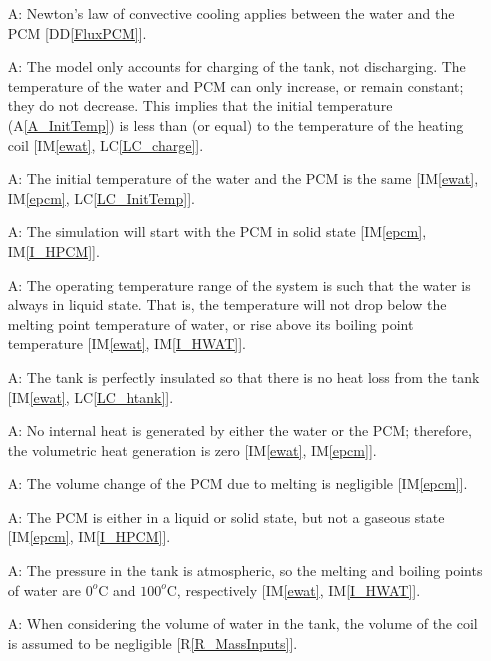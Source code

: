 \documentclass[12pt]{article}
\newcommand{\ddref}[1]{DD\ref{#1}}
\newcounter{assumpnum} %
\newcommand{\aref}[1]{A\ref{#1}}
\newcommand{\iref}[1]{IM\ref{#1}}
\newcommand{\rref}[1]{R\ref{#1}}
\newcommand{\lcref}[1]{LC\ref{#1}}
\begin{document}
\begin{itemize}
\item[A\refstepcounter{assumpnum}\theassumpnum \label{A_Newt_pcm}:] Newton's law
  of convective cooling applies between the water and the PCM [\ddref{FluxPCM}].

\item[A\refstepcounter{assumpnum}\theassumpnum \label{A_charge}:] The model only
  accounts for charging of the tank, not discharging.  The temperature of the
  water and PCM can only increase, or remain constant; they do not decrease.
  This implies that the initial temperature (\aref{A_InitTemp}) is less than (or
  equal) to the temperature of the heating coil [\iref{ewat},
  \lcref{LC_charge}].

\item[A\refstepcounter{assumpnum}\theassumpnum \label{A_InitTemp}:] The
  initial temperature of the water and the PCM is the same [\iref{ewat},
  \iref{epcm}, \lcref{LC_InitTemp}].

\item[A\refstepcounter{assumpnum}\theassumpnum \label{A_OpRangePCM}:] The
  simulation will start with the PCM in solid state [\iref{epcm},
  \iref{I_HPCM}].

\item[A\refstepcounter{assumpnum}\theassumpnum \label{A_OpRange}:] The operating
  temperature range of the system is such that the water is always in liquid
  state. That is, the temperature will not drop below the melting point
  temperature of water, or rise above its boiling point temperature
  [\iref{ewat}, \iref{I_HWAT}].
 
\item[A\refstepcounter{assumpnum}\theassumpnum \label{A_htank}:] The tank is
  perfectly insulated so that there is no heat loss from the tank [\iref{ewat},
  \lcref{LC_htank}].

\item[A\refstepcounter{assumpnum}\theassumpnum \label{A_int_heat}:] No internal
  heat is generated by either the water or the PCM; therefore, the volumetric
  heat generation is zero [\iref{ewat}, \iref{epcm}].
	
\item[A\refstepcounter{assumpnum}\theassumpnum \label{A_vpcm}:] The volume
  change of the PCM due to melting is negligible [\iref{epcm}].

\item[A\refstepcounter{assumpnum}\theassumpnum \label{A_PCM_state}:] The PCM is
  either in a liquid or solid state, but not a gaseous state [\iref{epcm},
  \iref{I_HPCM}].
  
\item[A\refstepcounter{assumpnum}\theassumpnum \label{A_Pressure}:] The pressure
  in the tank is atmospheric, so the melting and boiling points of water are
  $0^o\text{C}$ and $100^o\text{C}$, respectively [\iref{ewat}, \iref{I_HWAT}].

\item[A\refstepcounter{assumpnum}\theassumpnum \label{A_VolCoil}:] When
  considering the volume of water in the tank, the volume of the coil is assumed
  to be negligible [\rref{R_MassInputs}].
	
\end{itemize}
\end{document}
